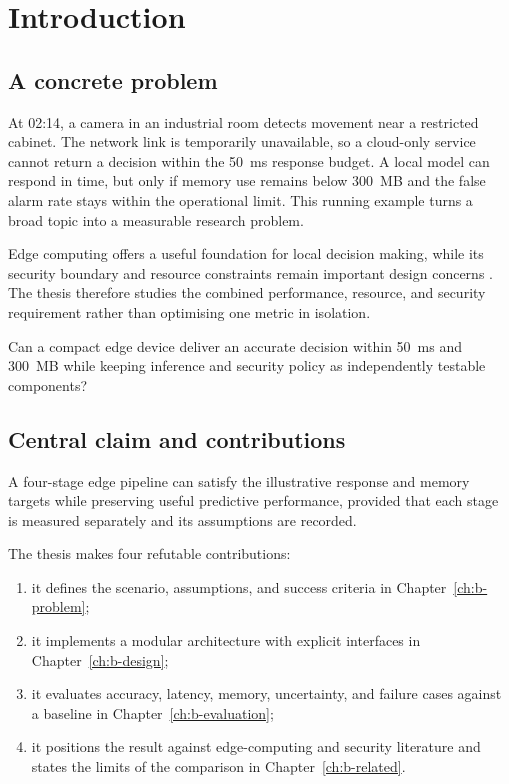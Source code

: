 \chapter{Introduction}\label{ch:b-introduction}
\section{A concrete problem}
At 02:14, a camera in an industrial room detects movement near a restricted cabinet. The network link is temporarily unavailable, so a cloud-only service cannot return a decision within the 50~ms response budget. A local model can respond in time, but only if memory use remains below 300~MB and the false alarm rate stays within the operational limit. This running example turns a broad topic into a measurable research problem.

Edge computing offers a useful foundation for local decision making, while its security boundary and resource constraints remain important design concerns \cite{shi2016edge,roman2018mobile}. The thesis therefore studies the combined performance, resource, and security requirement rather than optimising one metric in isolation.

\begin{researchquestion}
Can a compact edge device deliver an accurate decision within 50~ms and 300~MB while keeping inference and security policy as independently testable components?
\end{researchquestion}

\section{Central claim and contributions}
\begin{resultbox}
A four-stage edge pipeline can satisfy the illustrative response and memory targets while preserving useful predictive performance, provided that each stage is measured separately and its assumptions are recorded.
\end{resultbox}

The thesis makes four refutable contributions:
\begin{enumerate}
  \item it defines the scenario, assumptions, and success criteria in Chapter~\ref{ch:b-problem};
  \item it implements a modular architecture with explicit interfaces in Chapter~\ref{ch:b-design};
  \item it evaluates accuracy, latency, memory, uncertainty, and failure cases against a baseline in Chapter~\ref{ch:b-evaluation};
  \item it positions the result against edge-computing and security literature and states the limits of the comparison in Chapter~\ref{ch:b-related}.
\end{enumerate}

